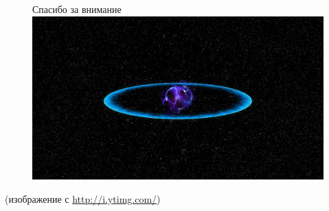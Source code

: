 \documentclass[8pt,pdf,hyperref={unicode},serif]{beamer}
\begin{document}
\begin{frame}

\begin{figure}[H]
\centering \Large
Спасибо за внимание
\includegraphics[width=0.8\linewidth]{shock_ill}
\end{figure}
{\small (изображение с \url{http://i.ytimg.com/})}
\end{frame}
\end{document}
